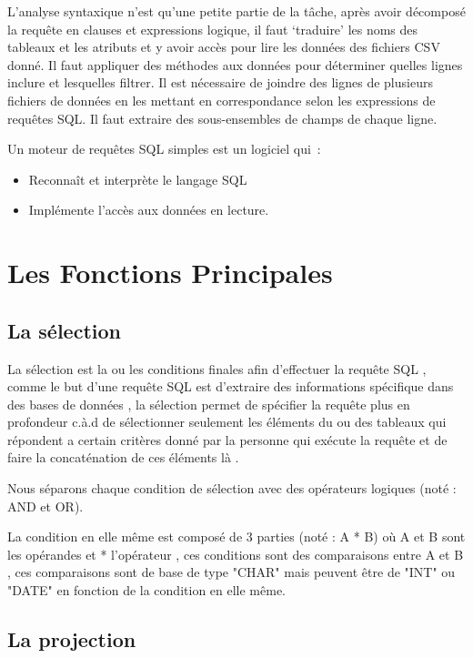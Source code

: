 \documentclass[oneside,13pt,a4paper]{report}
\begin{document}
        L’analyse syntaxique n’est qu’une petite partie de la tâche, 
        après avoir décomposé la requête en clauses et expressions logique, 
        il faut ‘traduire’ les noms des tableaux et les atributs et y avoir accès pour lire les données des fichiers CSV donné. 
        Il faut appliquer des méthodes aux données pour déterminer quelles lignes inclure et lesquelles filtrer. 
        Il est nécessaire de joindre des lignes de plusieurs fichiers de données en les mettant en correspondance selon les expressions de requêtes SQL. 
        Il faut extraire des sous-ensembles de champs de chaque ligne.
        
        Un moteur de requêtes SQL simples est un logiciel qui :
        \begin{itemize}
            \item Reconnaît et interprète le langage SQL 
            \item Implémente l’accès aux données en lecture.
        \end{itemize}

    \section{Les Fonctions Principales}

        \subsection{La sélection}

            La sélection est la ou les conditions finales afin d'effectuer la requête SQL , comme le but d'une requête SQL est d'extraire des informations spécifique dans des bases de données , la sélection permet de spécifier la requête plus en profondeur c.à.d de sélectionner seulement les éléments du ou des tableaux qui répondent a certain critères donné par la personne qui exécute la requête et de faire la concaténation de ces éléments là .

    	    Nous séparons chaque condition de sélection avec des opérateurs logiques (noté : AND et OR).

	        La condition en elle même est composé de 3 parties (noté : A * B) où A et B sont les opérandes et * l'opérateur , ces conditions sont des comparaisons entre A et B , ces comparaisons sont de base de type "CHAR" mais peuvent être de "INT" ou "DATE" en fonction de la condition en elle même.

        \subsection{La projection}
\end{document}
